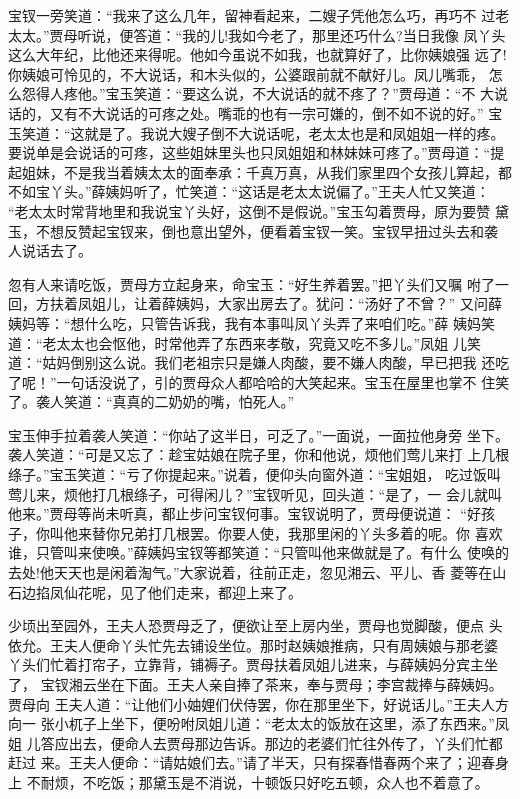 宝钗一旁笑道：“我来了这么几年，留神看起来，二嫂子凭他怎么巧，再巧不
过老太太。”贾母听说，便答道：“我的儿!我如今老了，那里还巧什么?当日我像
凤丫头这么大年纪，比他还来得呢。他如今虽说不如我，也就算好了，比你姨娘强
远了!你姨娘可怜见的，不大说话，和木头似的，公婆跟前就不献好儿。凤儿嘴乖，
怎么怨得人疼他。”宝玉笑道：“要这么说，不大说话的就不疼了？”贾母道：“不
大说话的，又有不大说话的可疼之处。嘴乖的也有一宗可嫌的，倒不如不说的好。”
宝玉笑道：“这就是了。我说大嫂子倒不大说话呢，老太太也是和凤姐姐一样的疼。
要说单是会说话的可疼，这些姐妹里头也只凤姐姐和林妹妹可疼了。”贾母道：“提
起姐妹，不是我当着姨太太的面奉承：千真万真，从我们家里四个女孩儿算起，都
不如宝丫头。”薛姨妈听了，忙笑道：“这话是老太太说偏了。”王夫人忙又笑道：
“老太太时常背地里和我说宝丫头好，这倒不是假说。”宝玉勾着贾母，原为要赞
黛玉，不想反赞起宝钗来，倒也意出望外，便看着宝钗一笑。宝钗早扭过头去和袭
人说话去了。

忽有人来请吃饭，贾母方立起身来，命宝玉：“好生养着罢。”把丫头们又嘱
咐了一回，方扶着凤姐儿，让着薛姨妈，大家出房去了。犹问：“汤好了不曾？”
又问薛姨妈等：“想什么吃，只管告诉我，我有本事叫凤丫头弄了来咱们吃。”薛
姨妈笑道：“老太太也会怄他，时常他弄了东西来孝敬，究竟又吃不多儿。”凤姐
儿笑道：“姑妈倒别这么说。我们老祖宗只是嫌人肉酸，要不嫌人肉酸，早已把我
还吃了呢！”一句话没说了，引的贾母众人都哈哈的大笑起来。宝玉在屋里也掌不
住笑了。袭人笑道：“真真的二奶奶的嘴，怕死人。”

宝玉伸手拉着袭人笑道：“你站了这半日，可乏了。”一面说，一面拉他身旁
坐下。袭人笑道：“可是又忘了：趁宝姑娘在院子里，你和他说，烦他们莺儿来打
上几根绦子。”宝玉笑道：“亏了你提起来。”说着，便仰头向窗外道：“宝姐姐，
吃过饭叫莺儿来，烦他打几根绦子，可得闲儿？”宝钗听见，回头道：“是了，一
会儿就叫他来。”贾母等尚未听真，都止步问宝钗何事。宝钗说明了，贾母便说道：
“好孩子，你叫他来替你兄弟打几根罢。你要人使，我那里闲的丫头多着的呢。你
喜欢谁，只管叫来使唤。”薛姨妈宝钗等都笑道：“只管叫他来做就是了。有什么
使唤的去处!他天天也是闲着淘气。”大家说着，往前正走，忽见湘云、平儿、香
菱等在山石边掐凤仙花呢，见了他们走来，都迎上来了。

少顷出至园外，王夫人恐贾母乏了，便欲让至上房内坐，贾母也觉脚酸，便点
头依允。王夫人便命丫头忙先去铺设坐位。那时赵姨娘推病，只有周姨娘与那老婆
丫头们忙着打帘子，立靠背，铺褥子。贾母扶着凤姐儿进来，与薛姨妈分宾主坐了，
宝钗湘云坐在下面。王夫人亲自捧了茶来，奉与贾母；李宫裁捧与薛姨妈。贾母向
王夫人道：“让他们小妯娌们伏侍罢，你在那里坐下，好说话儿。”王夫人方向一
张小杌子上坐下，便吩咐凤姐儿道：“老太太的饭放在这里，添了东西来。”凤姐
儿答应出去，便命人去贾母那边告诉。那边的老婆们忙往外传了，丫头们忙都赶过
来。王夫人便命：“请姑娘们去。”请了半天，只有探春惜春两个来了；迎春身上
不耐烦，不吃饭；那黛玉是不消说，十顿饭只好吃五顿，众人也不着意了。

